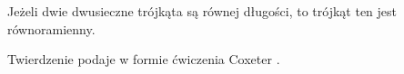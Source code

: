 %

\begin{theorem}
    \label{theorem_steiner_lehmus}
	Jeżeli dwie dwusieczne trójkąta są równej długości, to trójkąt ten jest równoramienny.
\end{theorem}

Twierdzenie podaje w formie ćwiczenia Coxeter \cite[s. 9]{coxeter_1991}.

%